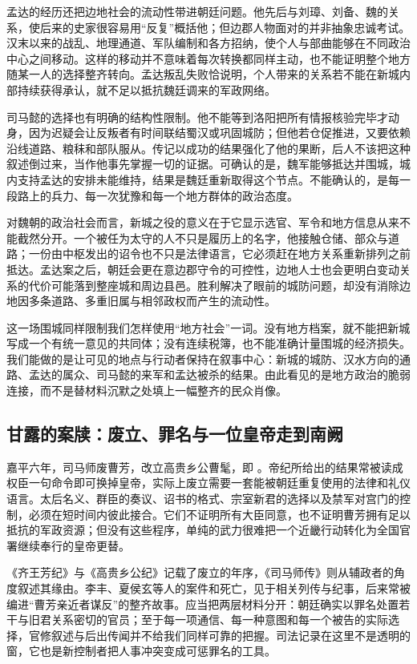 孟达的经历还把边地社会的流动性带进朝廷问题。他先后与刘璋、刘备、魏的关系，使后来的史家很容易用“反复”概括他；但边郡人物面对的并非抽象忠诚考试。汉末以来的战乱、地理通道、军队编制和各方招纳，使个人与部曲能够在不同政治中心之间移动。这样的移动并不意味着每次转换都同样主动，也不能证明整个地方随某一人的选择整齐转向。孟达叛乱失败恰说明，个人带来的关系若不能在新城内部持续获得承认，就不足以抵抗魏廷调来的军政网络。

司马懿的选择也有明确的结构性限制。他不能等到洛阳把所有情报核验完毕才动身，因为迟疑会让反叛者有时间联结蜀汉或巩固城防；但他若仓促推进，又要依赖沿线道路、粮秣和部队服从。传记以成功的结果强化了他的果断，后人不该把这种叙述倒过来，当作他事先掌握一切的证据。可确认的是，魏军能够抵达并围城，城内支持孟达的安排未能维持，结果是魏廷重新取得这个节点。不能确认的，是每一段路上的兵力、每一次犹豫和每一个地方群体的政治态度。

对魏朝的政治社会而言，新城之役的意义在于它显示选官、军令和地方信息从来不能截然分开。一个被任为太守的人不只是履历上的名字，他接触仓储、部众与道路；一份由中枢发出的诏令也不只是法律语言，它必须赶在地方关系重新排列之前抵达。孟达案之后，朝廷会更在意边郡守令的可控性，边地人士也会更明白变动关系的代价可能落到整座城和周边县邑。胜利解决了眼前的城防问题，却没有消除边地因多条道路、多重旧属与相邻政权而产生的流动性。

这一场围城同样限制我们怎样使用“地方社会”一词。没有地方档案，就不能把新城写成一个有统一意见的共同体；没有连续税簿，也不能准确计量围城的经济损失。我们能做的是让可见的地点与行动者保持在叙事中心：新城的城防、汉水方向的通路、孟达的属众、司马懿的来军和孟达被杀的结果。由此看见的是地方政治的脆弱连接，而不是替材料沉默之处填上一幅整齐的民众肖像。

\subsection{甘露的案牍：废立、罪名与一位皇帝走到南阙}

嘉平六年，司马师废曹芳，改立高贵乡公曹髦，即
。帝纪所给出的结果常被读成权臣一句命令即可换掉皇帝，实际上废立需要一套能被朝廷重复使用的法律和礼仪语言。太后名义、群臣的奏议、诏书的格式、宗室新君的选择以及禁军对宫门的控制，必须在短时间内彼此接合。它们不证明所有大臣同意，也不证明曹芳拥有足以抵抗的军政资源；但没有这些程序，单纯的武力很难把一个近畿行动转化为全国官署继续奉行的皇帝更替。

《齐王芳纪》与《高贵乡公纪》记载了废立的年序，《司马师传》则从辅政者的角度叙述其缘由。李丰、夏侯玄等人的案件和死亡，见于相关列传与纪事，后来常被编进“曹芳亲近者谋反”的整齐故事。应当把两层材料分开：朝廷确实以罪名处置若干与旧君关系密切的官员；至于每一项通信、每一种意图和每一个被告的实际选择，官修叙述与后出传闻并不给我们同样可靠的把握。司法记录在这里不是透明的窗，它也是新控制者把人事冲突变成可惩罪名的工具。

